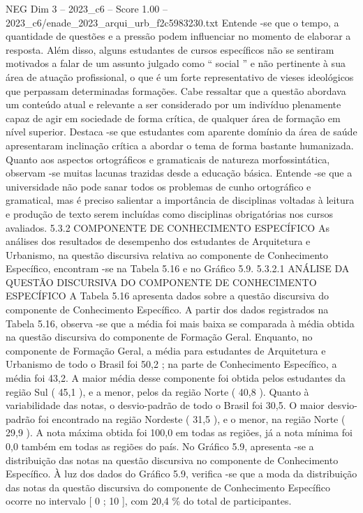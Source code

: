 \begin{textsample}{NEG Dim 3 – 2023\_c6 – Score 1.00 – 2023\_c6/enade\_2023\_arqui\_urb\_f2c5983230.txt}
Entende -se que o tempo, a quantidade de questões e a pressão podem influenciar no momento de elaborar a resposta.
Além disso, alguns estudantes de cursos específicos não se sentiram motivados a falar de um assunto julgado como “ social ” e não pertinente à sua área de atuação profissional, o que é um forte representativo de vieses ideológicos que perpassam determinadas formações.
Cabe ressaltar que a questão abordava um conteúdo atual e relevante a ser considerado por um indivíduo plenamente capaz de agir em sociedade de forma crítica, de qualquer área de formação em nível superior.
Destaca -se que estudantes com aparente domínio da área de saúde apresentaram inclinação crítica a abordar o tema de forma bastante humanizada.
Quanto aos aspectos ortográficos e gramaticais de natureza morfossintática, observam -se muitas lacunas trazidas desde a educação básica.
Entende -se que a universidade não pode sanar todos os problemas de cunho ortográfico e gramatical, mas é preciso salientar a importância de disciplinas voltadas à leitura e produção de texto serem incluídas como disciplinas obrigatórias nos cursos avaliados. 5.3.2 COMPONENTE DE CONHECIMENTO ESPECÍFICO As análises dos resultados de desempenho dos estudantes de Arquitetura e Urbanismo, na questão discursiva relativa ao componente de Conhecimento Específico, encontram -se na Tabela 5.16 e no Gráfico 5.9. 5.3.2.1 ANÁLISE DA QUESTÃO DISCURSIVA DO COMPONENTE DE CONHECIMENTO ESPECÍFICO A Tabela 5.16 apresenta dados sobre a questão discursiva do componente de Conhecimento Específico.
A partir dos dados registrados na Tabela 5.16, observa -se que a média foi mais baixa se comparada à média obtida na questão discursiva do componente de Formação Geral.
Enquanto, no componente de Formação Geral, a média para estudantes de Arquitetura e Urbanismo de todo o Brasil foi 50,2 ; na parte de Conhecimento Específico, a média foi 43,2.
A maior média desse componente foi obtida pelos estudantes da região Sul ( 45,1 ), e a menor, pelos da região Norte ( 40,8 ).
Quanto à variabilidade das notas, o desvio-padrão de todo o Brasil foi 30,5.
O maior desvio-padrão foi encontrado na região Nordeste ( 31,5 ), e o menor, na região Norte ( 29,9 ).
A nota máxima obtida foi 100,0 em todas as regiões, já a nota mínima foi 0,0 também em todas as regiões do país.
No Gráfico 5.9, apresenta -se a distribuição das notas na questão discursiva no componente de Conhecimento Específico.
À luz dos dados do Gráfico 5.9, verifica -se que a moda da distribuição das notas da questão discursiva do componente de Conhecimento Específico ocorre no intervalo [ 0 ; 10 ], com 20,4 \% do total de participantes.

\end{textsample}

